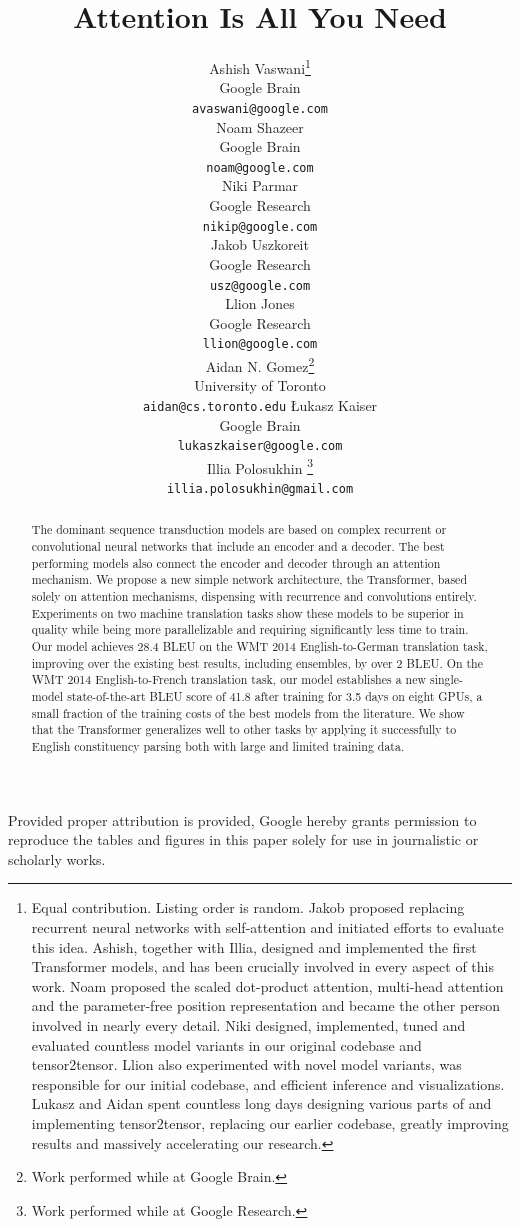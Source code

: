 \documentclass{article}
\title{Attention Is All You Need}
\author{
  \AND
  Ashish Vaswani\thanks{Equal contribution. Listing order is random. Jakob proposed replacing recurrent neural networks with self-attention and initiated efforts to evaluate this idea.
Ashish, together with Illia, designed and implemented the first Transformer models, and has been crucially involved in every aspect of this work. Noam proposed the scaled dot-product attention, multi-head attention and the parameter-free position representation and became the other person involved in nearly every detail. Niki designed, implemented, tuned and evaluated countless model variants in our original codebase and tensor2tensor. Llion also experimented with novel model variants, was responsible for our initial codebase, and efficient inference and visualizations. Lukasz and Aidan spent countless long days designing various parts of and implementing tensor2tensor, replacing our earlier codebase, greatly improving results and massively accelerating our research.
}\\
  Google Brain\\
  \texttt{avaswani@google.com}\\
  \And
  Noam Shazeer\footnotemark[1]\\
  Google Brain\\
  \texttt{noam@google.com}\\
  \And
  Niki Parmar\footnotemark[1]\\
  Google Research\\
  \texttt{nikip@google.com}\\  
  \And
  Jakob Uszkoreit\footnotemark[1]\\
  Google Research\\
  \texttt{usz@google.com}\\
  \And  
  Llion Jones\footnotemark[1]\\
  Google Research\\
  \texttt{llion@google.com}\\   
  \And
  Aidan N. Gomez\footnotemark[1] \hspace{1.7mm}\thanks{Work performed while at Google Brain.}\\
  University of Toronto\\
  \texttt{aidan@cs.toronto.edu}
  \And
  {\L}ukasz Kaiser\footnotemark[1]\\
  Google Brain\\
  \texttt{lukaszkaiser@google.com}\\
  \And
  Illia Polosukhin\footnotemark[1]\hspace{1.7mm} \thanks{Work performed while at Google Research.}\\
  \texttt{illia.polosukhin@gmail.com}\\  
}
\begin{document}
\begin{center}
    \color{red}
    \large Provided proper attribution is provided, Google hereby grants permission to reproduce the tables and figures in this paper solely for use in journalistic or scholarly works.
\end{center}

\maketitle

\begin{abstract}
The dominant sequence transduction models are based on complex recurrent or convolutional neural networks that include an encoder and a decoder. The best performing models also connect the encoder and decoder through an attention mechanism. We propose a new simple network architecture, the Transformer, based solely on attention mechanisms, dispensing with recurrence and convolutions entirely. Experiments on two machine translation tasks show these models to be superior in quality while being  more parallelizable and requiring significantly less time to train. Our model achieves 28.4 BLEU on the WMT 2014 English-to-German translation task, improving over the existing best results, including ensembles, by over 2 BLEU.  On the WMT 2014 English-to-French translation task, our model establishes a new single-model state-of-the-art BLEU score of 41.8 after training for 3.5 days on eight GPUs, a small fraction of the training costs of the best models from the literature. We show that the Transformer generalizes well to other tasks by applying it successfully to English constituency parsing  both with large and limited training data.



\end{abstract}
\end{document}
